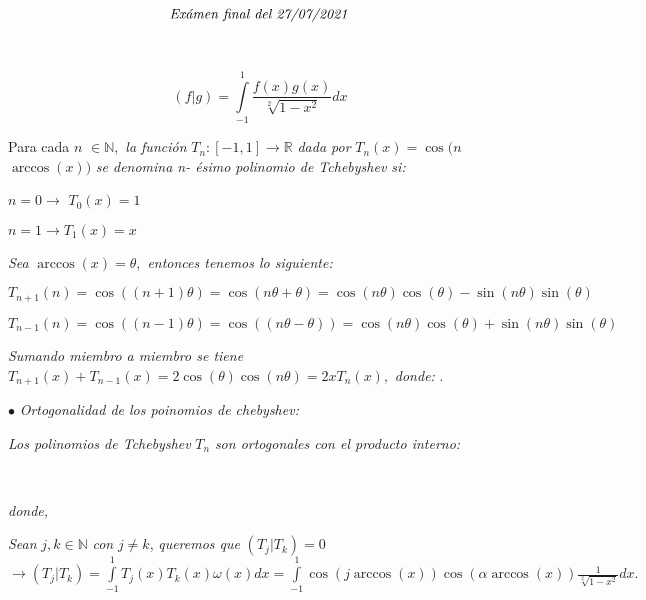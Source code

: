 \documentclass{article}
\begin{document}
\[
\text{\emph{Ex\'{a}men final del 27/07/2021}} 
\]

\textit{\ }

\[
(f|g)=\int\limits_{-1}^{1}\frac{f(x)g(x)}{\sqrt[2]{1-x^{2}}}dx 
\]


Para cada $n$ $\in 
\mathbb{N}
$,\textit{\ la funci\'{o}n }$T_{n}:\left[ -1,1\right] \rightarrow 
\mathbb{R}
$ \textit{dada por }$T_{n}(x)=\cos (n$ $\arccos (x))$ \textit{se denomina n-%
\'{e}simo polinomio de Tchebyshev si: }

$n=0\rightarrow $ $T_{0}(x)=1$

$n=1\rightarrow T_{1}(x)=x$

\textit{Sea }$\arccos (x)=\theta $,\textit{\ entonces tenemos lo siguiente:}

$T_{n+1}(n)=\cos ((n+1)\theta )=\cos (n\theta +\theta )=\cos (n\theta )\cos
(\theta )-\sin (n\theta )\sin (\theta )$

$T_{n-1}(n)=\cos ((n-1)\theta )=\cos ((n\theta -\theta ))=\cos (n\theta
)\cos (\theta )+\sin (n\theta )\sin (\theta )$

\bigskip \textit{Sumando miembro a miembro se tiene }$%
T_{n+1}(x)+T_{n-1}(x)=2\cos (\theta )\cos (n\theta )=2xT_{n}(x),$ \textit{%
donde: }.

$\bullet $ \textit{Ortogonalidad de los poinomios de chebyshev:}

\textit{Los polinomios de Tchebyshev }$T_{n}$ \textit{son ortogonales con el
producto interno:}

\ \ \ \ \ \ \ \ \ \ \ \ \ \ \ \ \ \ \ \ \ \ \ \ \ \ \ \ \ \ \ \ \ \ \ \ \ \
\ \ \ \ \ \ \ \ \ \ \ \ \ \ \ \ \ \ \ \ \ \ \ \ \ \ \ \ \ \ \ \ \frame{$(f$ $%
|$ $g)=\int\limits_{-1}^{1}f(x)g(x)\omega (x)dx$}

\textit{donde, }

\textit{Sean }$j,k\in 
\mathbb{N}
$ \textit{con }$j\neq k$, \textit{queremos que }$(T_{j}|T_{k})=0$ $%
\rightarrow (T_{j}|T_{k})=\int\limits_{-1}^{1}T_{j}(x)T_{k}(x)\omega
(x)dx=\int\limits_{-1}^{1}\cos (j\arccos (x))\cos (\alpha \arccos (x))\frac{1%
}{\sqrt[2]{1-x^{2}}}dx.$
\end{document}
